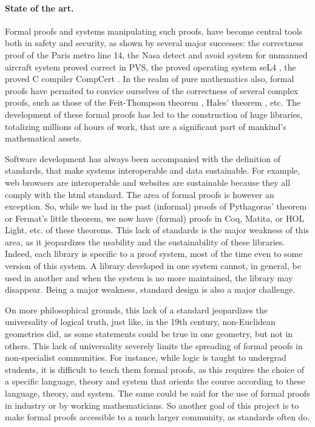 \paragraph{State of the art.}
Formal proofs and systems manipulating such proofs, have become
central tools both in safety and security, as shown by several major
successes: the correctness proof of the Paris metro line 14, the Nasa
detect and avoid system for unmanned aircraft system proved correct in
PVS, the proved operating system seL4 \cite{Klein09}, the proved C
compiler CompCert \cite{Leroy06}.  In the realm of pure mathematics
also, formal proofs have permited to convice ourselves of the
correctness of several complex proofs, such as those of the Feit-Thompson
theorem \cite{Gonthier13}, Hales' theorem
\cite{Hales17}, etc.  The development of these formal proofs has led
to the construction of huge libraries, totalizing millions of hours of
work, that are a significant part of mankind's mathematical assets.

Software development has always been accompanied with the definition
of standards, that make systems interoperable and data
sustainable. For example, web browsers are interoperable and websites
are sustainable because they all comply with the html standard. The
area of formal proofs is however an exception. So, while we had in the
past (informal) proofs of Pythagoras' theorem or Fermat's little
theorem, we now have (formal) proofs in {\sc Coq}, {\sc Matita}, or
{\sc HOL Light}, etc. of these theorems. This lack of standards is
the major weakness of this area, as it jeopardizes the usability and
the sustainability of these libraries. Indeed, each library is
specific to a proof system, most of the time even to some version of
this system. A library developed in one system cannot, in general, be
used in another and when the system is no more maintained, the library
may disappear. Being a major weakness, standard design is also a major
challenge.

On more philosophical grounds, this lack of a standard jeopardizes the
universality of logical truth, just like, in the 19th century,
non-Euclidean geometries did, as some statements could be true in one
geometry, but not in others.  This lack of universality severely
limits the spreading of formal proofs in non-specialist
communities. For instance, while logic is taught to undergrad
students, it is difficult to teach them formal proofs, as this
requires the choice of a specific language, theory and system that
orients the course according to these language, theory, and
system. The same could be said for the use of formal proofs in
industry or by working mathematicians. So another goal of this project
is to make formal proofs accessible to a much larger community, as
standards often do.

